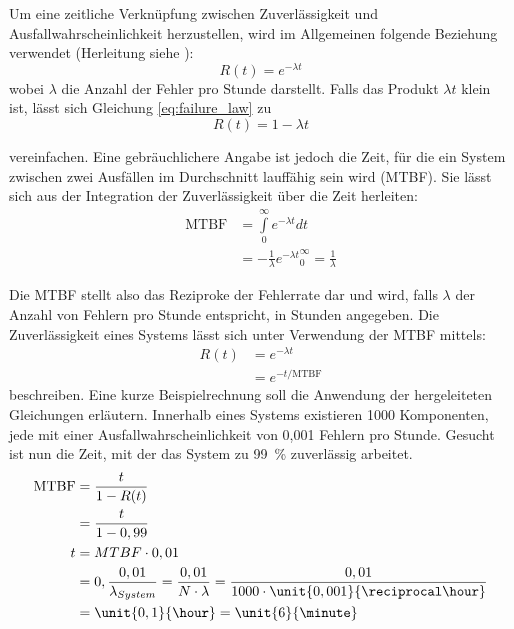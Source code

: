 Um eine zeitliche Verknüpfung zwischen Zuverlässigkeit und
Ausfallwahrscheinlichkeit herzustellen, wird im Allgemeinen folgende
Beziehung verwendet (Herleitung siehe \cite[S.4 ff.]{lala2001}):
\begin{equation}
  \label{eq:failure_law}
  R(t) = e^{-\lambda t}
\end{equation}
wobei $\lambda$ die Anzahl der Fehler pro Stunde darstellt. Falls das
Produkt $\lambda t$ klein ist, lässt sich Gleichung \ref{eq:failure_law}
zu 
\begin{equation}
  \label{eq:failure_law_simple}
  R(t) = 1-\lambda t
\end{equation}

vereinfachen. Eine gebräuchlichere Angabe ist jedoch die Zeit, für die ein
System zwischen zwei Ausfällen im Durchschnitt lauffähig sein wird
(MTBF). Sie lässt sich aus der Integration der Zuverlässigkeit über
die Zeit herleiten:
\begin{align}
  \label{eq:mtbf}
  \nonumber  \text{MTBF} & = \int\limits_{0}^{\infty} e^{-\lambda t} dt\\
  & = -\frac{1}{\lambda}{e^{-\lambda t}}_0^{\infty}  = \frac{1}{\lambda}
\end{align}

Die MTBF stellt also das Reziproke der Fehlerrate dar und wird, falls
$\lambda$ der Anzahl von Fehlern pro Stunde entspricht, in Stunden
angegeben. Die Zuverlässigkeit eines Systems lässt sich unter
Verwendung der MTBF mittels:
\begin{align}
  \label{eq:reliability_mtbf}
  \nonumber R(t) & = e^{-\lambda t}\\
  & = e^{-t/\text{MTBF}}
\end{align}
beschreiben. Eine kurze Beispielrechnung soll die Anwendung der hergeleiteten
Gleichungen erläutern. Innerhalb eines Systems existieren 1000
Komponenten, jede mit einer Ausfallwahrscheinlichkeit von 0,001 Fehlern
pro Stunde. Gesucht ist nun die Zeit, mit der das System zu 99~\%
zuverlässig arbeitet.
\label{eq:reliability_rechnung}
\begin{align*}
  \text{MTBF} & = \frac{t}{1-R(t)}\\
  & = \frac{t}{1-0,99}\\
  t & = MTBF \cdot 0,01\\
  & = 0,\frac{0,01}{\lambda_{System}} = \frac{0,01} {N \cdot
    \lambda} = \frac{0,01}{1000 \cdot \unit{0,001}{\reciprocal\hour}} \\
  & = \unit{0,1}{\hour} = \unit{6}{\minute}
\end{align*}

